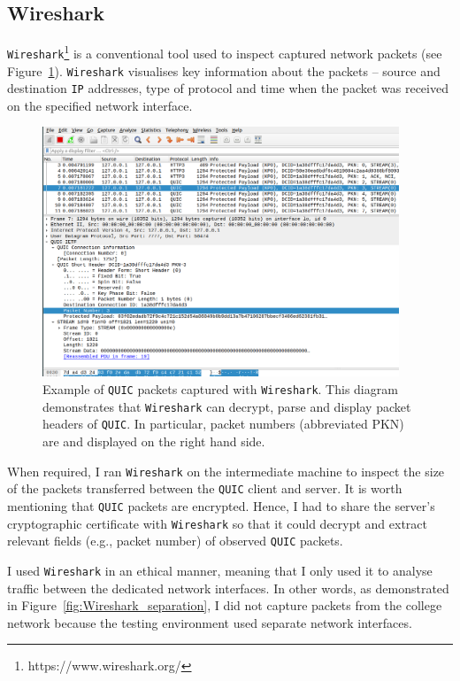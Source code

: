 \documentclass[12pt,a4paper]{report}
\begin{document}
\subsection{Wireshark}

\texttt{Wireshark}\footnote{https://www.wireshark.org/} is a conventional tool used to inspect captured network packets (see Figure~\ref{fig:Wireshark_screenshot}).
\texttt{Wireshark} visualises key information about the packets -- source and destination \texttt{IP} addresses, type of protocol and time when the packet was received on the specified network interface.

    \begin{figure}[H]
    \centering
    \includegraphics[width=0.95\textwidth]{figs/Wireshark_screenshot.png}
    \caption[Example of \texttt{QUIC} packets captured with \texttt{Wireshark}]{Example of \texttt{QUIC} packets captured with \texttt{Wireshark}. This diagram demonstrates that \texttt{Wireshark} can decrypt, parse and display packet headers of \texttt{QUIC}. In particular, packet numbers (abbreviated PKN) are and displayed on the right hand side.}
    \label{fig:Wireshark_screenshot}
    \end{figure}
    
When required, I ran \texttt{Wireshark} on the intermediate machine to inspect the size of the packets transferred between the \texttt{QUIC} client and server.
It is worth mentioning that \texttt{QUIC} packets are encrypted.
Hence, I had to share the server's cryptographic certificate with \texttt{Wireshark} so that it could decrypt and extract relevant fields (e.g., packet number) of observed \texttt{QUIC} packets.

I used \texttt{Wireshark} in an ethical manner, meaning that I only used it to analyse traffic between the dedicated network interfaces.
In other words, as demonstrated in Figure~\ref{fig:Wireshark_separation}, I did not capture packets from the college network because the testing environment used separate network interfaces. 
\end{document}
